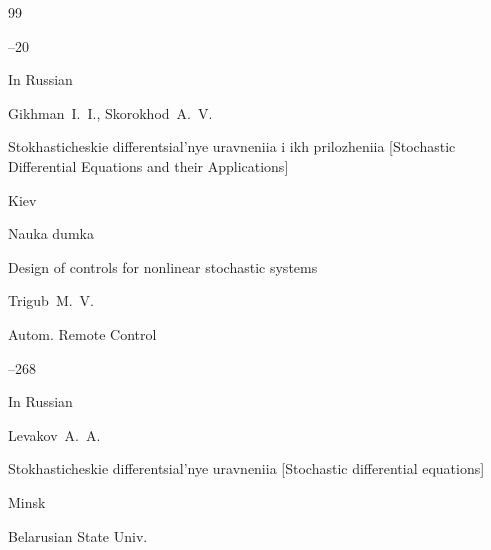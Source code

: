 \begin{thebibliography}{99}



--20






\lang In Russian

\by Gikhman~I.~I., Skorokhod~A.~V.

\book  Stokhasticheskie differentsial'nye uravneniia i ikh prilozheniia \rm [Stochastic Differential Equations and their Applications]

\publaddr Kiev

\publ Nauka dumka








\paper Design of controls for nonlinear stochastic systems

\by  Trigub~M.~V.

\jour Autom. Remote Control




--268









\lang In Russian

\by Levakov~A.~A.

\book Stokhasticheskie differentsial'nye uravneniia \rm [Stochastic differential equations]

\publaddr Minsk

\publ Belarusian State Univ.









\end{thebibliography}
